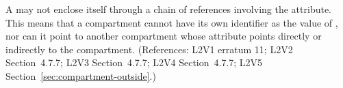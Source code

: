 A \Compartment may not enclose itself through a chain of references
involving the  attribute.  This means that a compartment cannot
have its own identifier as the value of , nor can it point
to another compartment whose  attribute points directly or
indirectly to the compartment.  (References: L2V1 erratum 11; L2V2 Section~4.7.7;
L2V3 Section~4.7.7; L2V4 Section~4.7.7; L2V5 Section~\ref{sec:compartment-outside}.)
